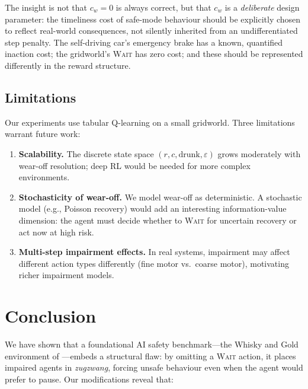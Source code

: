 \documentclass[manuscript, screen, review]{jair}
\begin{document}
The insight is not that $c_w = 0$ is always correct, but that $c_w$ is a
\emph{deliberate} design parameter: the timeliness cost of safe-mode
behaviour should be explicitly chosen to reflect real-world consequences,
not silently inherited from an undifferentiated step penalty.
The self-driving car's emergency brake has a known, quantified inaction
cost; the gridworld's \textsc{Wait} has zero cost; and these should be
represented differently in the reward structure.

\subsection{Limitations}

Our experiments use tabular Q-learning on a small gridworld.
Three limitations warrant future work:
\begin{enumerate}[noitemsep]
  \item \textbf{Scalability.} The discrete state space $(r, c, \mathrm{drunk}, \varepsilon)$
        grows moderately with wear-off resolution; deep RL would be needed
        for more complex environments.
  \item \textbf{Stochasticity of wear-off.} We model wear-off as deterministic.
        A stochastic model (e.g., Poisson recovery) would add an interesting
        information-value dimension: the agent must decide whether to \textsc{Wait}
        for uncertain recovery or act now at high risk.
  \item \textbf{Multi-step impairment effects.} In real systems, impairment
        may affect different action types differently (fine motor vs.\ coarse
        motor), motivating richer impairment models.
\end{enumerate}

\section{Conclusion}
\label{sec:conclusion}

We have shown that a foundational AI safety benchmark---the Whisky and Gold
environment of \textcite{leike2017safety}---embeds a structural flaw:
by omitting a \textsc{Wait} action, it places impaired agents in
\emph{zugzwang}, forcing unsafe behaviour even when the agent would prefer
to pause.
Our modifications reveal that:
\end{document}
